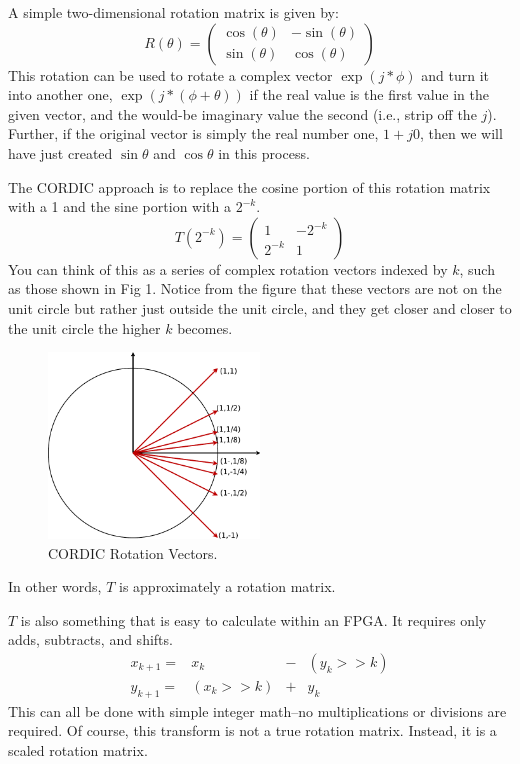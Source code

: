 \documentclass[a4paper,12pt,twoside]{article}
\begin{document}
A simple two-dimensional rotation matrix is given by:
\begin{equation}
    R(\theta)=\begin{pmatrix}
        \cos{(\theta)}&-\sin{(\theta)}\\
        \sin{(\theta)}&\cos{(\theta)}
    \end{pmatrix}
\end{equation}
This rotation can be used to rotate a complex vector $\exp{(j*\phi)}$ and turn it into another one, $\exp{(j*(\phi+\theta))}$ if the real value is the first value in the given vector, and the would-be imaginary value the second (i.e., strip off the $j$). Further, if the original vector is simply the real number one, $1+j0$, then we will have just created $\sin{\theta}$ and $\cos{\theta}$ in this process.

The CORDIC approach is to replace the cosine portion of this rotation matrix with a 1 and the sine portion with a $2^{-k}$.
\begin{equation}
    T(2^{-k})=\begin{pmatrix}
        1&-2^{-k}\\
        2^{-k}&1
    \end{pmatrix}
\end{equation}
You can think of this as a series of complex rotation vectors indexed by $k$, such as those shown in Fig 1. Notice from the figure that these vectors are not on the unit circle but rather just outside the unit circle, and they get closer and closer to the unit circle the higher $k$ becomes.
\begin{figure}[H]
    \centering
    \includegraphics[width=0.5\textwidth]{images/4.pdf}
    \caption{CORDIC Rotation Vectors.}
\end{figure}
In other words, $T$ is approximately a rotation matrix.

$T$ is also something that is easy to calculate within an FPGA. It requires only adds, subtracts, and shifts.
\begin{equation}
\begin{array}{cccc}
    x_{k+1}=&x_k&-&(y_k>>k)\\
    y_{k+1}=&(x_k>>k)&+&y_k
\end{array}
\end{equation}
This can all be done with simple integer math–no multiplications or divisions are required. Of course, this transform is not a true rotation matrix. Instead, it is a scaled rotation matrix.
\end{document}

